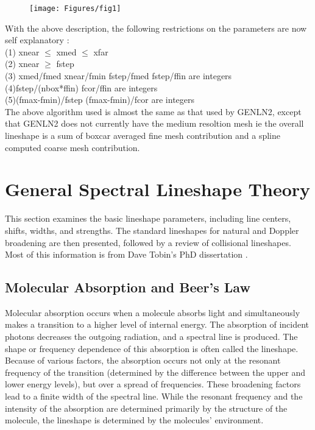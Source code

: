\documentclass[11pt]{article}
\begin{document}
\begin{figure}
  \begin{center}\texttt{[image: Figures/fig1]}\end{center}
  \caption[Cartoon of Parameter Relations]{}
  \label{fig:cartoon_param}
\end{figure}

With the above description, the following restrictions on the parameters are
now self explanatory : \\
(1) xnear $\le$ xmed $\le$ xfar        \\
(2) xnear $\ge$ fstep              \\
(3) xmed/fmed  xnear/fmin   fstep/fmed   fstep/ffin       are integers \\
(4)fstep/(nbox*ffin)        fcor/ffin                     are integers \\
(5)(fmax-fmin)/fstep        (fmax-fmin)/fcor              are integers \\

The above algorithm used is almost the same as that used by GENLN2, except 
that GENLN2 does not currently have the medium resoltion mesh ie the overall 
lineshape is a sum of boxcar averaged fine mesh contribution and a spline
computed coarse mesh contribution.

\section{General Spectral Lineshape Theory}\label{chpt:shapes}

This section examines the basic lineshape parameters,
including line centers, shifts, widths, and strengths.  The standard 
lineshapes for natural and Doppler broadening are then presented, followed 
by a review of collisional lineshapes. Most of this information 
is from Dave Tobin's PhD dissertation \cite{tob:96}.

\subsection{Molecular Absorption and Beer's Law}\label{sec:beerslaw}

Molecular absorption occurs when a molecule absorbs light and 
simultaneously makes a transition to a higher level of internal 
energy.  The absorption of incident photons decreases the outgoing 
radiation, and a spectral line is produced.  The shape or frequency 
dependence of this absorption is often called the lineshape.  Because 
of various factors, the absorption occurs not only at the resonant 
frequency of the transition (determined by the difference between the 
upper and lower energy levels), but over a spread of frequencies.  
These broadening factors lead to a finite width of the spectral 
line.  While the resonant frequency and the intensity of the 
absorption are determined primarily by the structure of the molecule, the 
lineshape is determined by the molecules' environment.  
\end{document}
